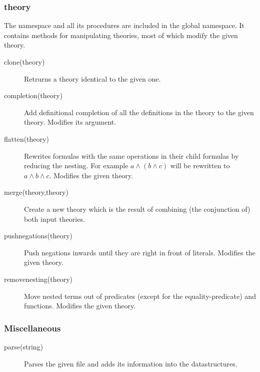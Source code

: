 \subsubsection{theory}
The  namespace and all its procedures are included in the global namespace. It contains methods for manipulating theories, most of which modify the given theory.
\begin{description}
	\item[clone(theory)]
		Retrurns a theory identical to the given one.
	\item[completion(theory)]
		Add definitional completion of all the definitions in the theory to the given theory. Modifies its argument.
	\item[flatten(theory)]
		Rewrites formulas with the same operations in their child formulas by reducing the nesting. For example $a \wedge (b\wedge c)$ will be rewritten to $a\wedge b \wedge c$.
		Modifies the given theory. 
	\item[merge(theory,theory)]
 		Create a new theory which is the result of combining (the conjunction of) both input theories.
	\item[pushnegations(theory)]
 		Push negations inwards until they are right in front of literals.
 		Modifies the given theory.
	\item[removenesting(theory)]
 		Move nested terms out of predicates (except for the equality-predicate) and functions.
 		Modifies the given theory.
\end{description}










\subsubsection{Miscellaneous}
\begin{description}
	
	
	\item[parse(string)]
 		Parses the given file and adds its information into the datastructures.

\end{description}





